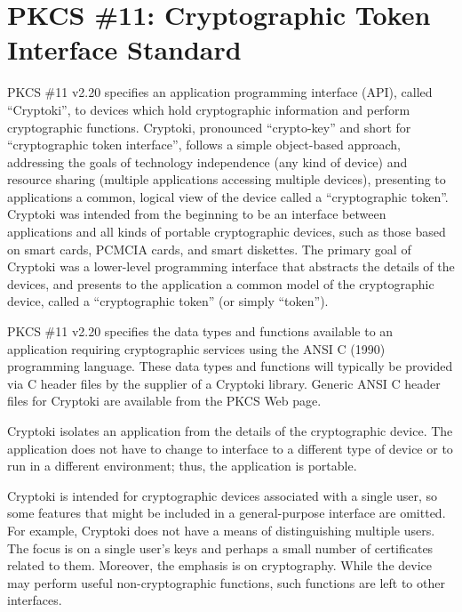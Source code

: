 \documentclass{article}
\begin{document}
\section{PKCS \#11: Cryptographic Token Interface Standard}
\label{pkcs11}
PKCS \#11 v2.20 specifies an application programming interface (API), 
called ``Cryptoki'', to devices which hold cryptographic information 
and perform cryptographic functions.  Cryptoki, pronounced ``crypto-key'' 
and short for ``cryptographic token interface'', follows a simple 
object-based approach, addressing the goals of technology independence 
(any kind of device) and resource sharing (multiple applications 
accessing multiple devices), presenting to applications a common, 
logical view of the device called a ``cryptographic token''.
Cryptoki was intended from the beginning to be an interface between 
applications and all kinds of portable cryptographic devices, 
such as those based on smart cards, PCMCIA cards, and smart diskettes.  
The primary goal of Cryptoki was a lower-level programming interface 
that abstracts the details of the devices, and presents to the application 
a common model of the cryptographic device, called a ``cryptographic token'' 
(or simply ``token'').

PKCS \#11 v2.20 specifies the data types and functions available to 
an application requiring cryptographic services using the ANSI C (1990)
programming language.  These data types and functions will typically 
be provided via C header files by the supplier of a Cryptoki library.  
Generic ANSI C header files for Cryptoki are available from the PKCS Web page.

Cryptoki isolates an application from the details of the cryptographic 
device.  The application does not have to change to interface to a 
different type of device or to run in a different environment; thus, 
the application is portable.  

Cryptoki is intended for cryptographic devices associated with a 
single user, so some features that might be included in a general-purpose 
interface are omitted.  For example, Cryptoki does not have a means of 
distinguishing multiple users.  The focus is on a single user's keys 
and perhaps a small number of certificates related to them. Moreover, 
the emphasis is on cryptography.  While the device may perform useful 
non-cryptographic functions, such functions are left to other interfaces.
\end{document}
